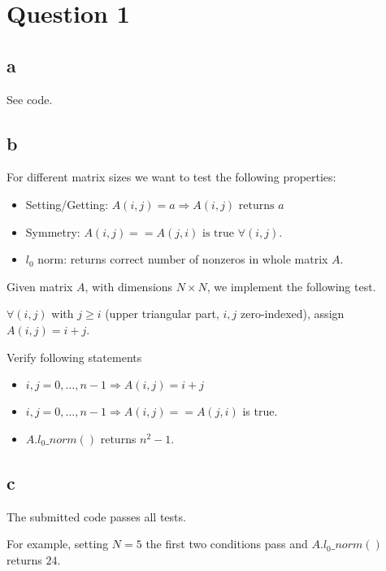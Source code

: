 \section{Question 1}

\subsection{a}
See code.

\subsection{b}

For different matrix sizes we want to test the following properties:
\begin{itemize}
	\item Setting/Getting: $A(i,j)=a \Rightarrow A(i,j) \text{ returns } a$
	\item Symmetry: $A(i,j) == A(j,i) \text{ is true } \forall (i,j)$.
	\item $l_0$ norm: returns correct number of nonzeros in whole matrix $A$.
\end{itemize}

Given matrix $A$, with dimensions $N \times N$, we implement the following test.

$\forall (i,j)$ with $j\geq i$ (upper triangular part, $i,j$ zero-indexed), assign $A(i,j) = i+j$.

Verify following statements
\begin{itemize}
	\item $i,j=0,...,n-1 \Rightarrow A(i,j)=i+j$
	\item $i,j=0,...,n-1 \Rightarrow A(i,j)==A(j,i)$ is true.
	\item $A.l_0\_norm()$ returns $n^2-1$.
\end{itemize}

\subsection{c}
The submitted code passes all tests.

For example, setting $N=5$ the first two conditions pass and $A.l_0\_norm()$ returns $24$.